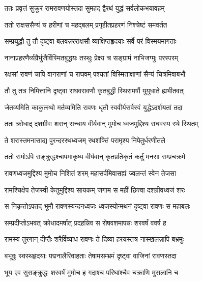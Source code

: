 
\twolineshloka
{ततः प्रवृत्तं सुक्रूरं रामरावणयोस्तदा}
{सुमहद् द्वैरथं युद्धं सर्वलोकभयावहम्} %

\twolineshloka
{ततो राक्षससैन्यं च हरीणां च महद्बलम्}
{प्रगृहीतप्रहरणं निश्चेष्टं समवर्तत} %

\twolineshloka
{सम्प्रयुद्धौ तु तौ दृष्ट्वा बलवन्नरराक्षसौ}
{व्याक्षिप्तहृदयाः सर्वे परं विस्मयमागताः} %

\twolineshloka
{नानाप्रहरणैर्व्यग्रैर्भुजैर्विस्मितबुद्धयः}
{तस्थुः प्रेक्ष्य च सङ्ग्रामं नाभिजग्मुः परस्परम्} %

\twolineshloka
{रक्षसां रावणं चापि वानराणां च राघवम्}
{पश्यतां विस्मिताक्षाणां सैन्यं चित्रमिवाबभौ} %

\twolineshloka
{तौ तु तत्र निमित्तानि दृष्ट्वा राघवरावणौ}
{कृतबुद्धी स्थिरामर्षौ युयुधाते ह्यभीतवत्} %

\twolineshloka
{जेतव्यमिति काकुत्स्थो मर्तव्यमिति रावणः}
{धृतौ स्ववीर्यसर्वस्वं युद्धेऽदर्शयतां तदा} %

\twolineshloka
{ततः क्रोधाद् दशग्रीवः शरान् सन्धाय वीर्यवान्}
{मुमोच ध्वजमुद्दिश्य राघवस्य रथे स्थितम्} %

\twolineshloka
{ते शरास्तमनासाद्य पुरन्दररथध्वजम्}
{रथशक्तिं परामृश्य निपेतुर्धरणीतले} %

\twolineshloka
{ततो रामोऽपि सङ्क्रुद्धश्चापमाकृष्य वीर्यवान्}
{कृतप्रतिकृतं कर्तुं मनसा सम्प्रचक्रमे} %

\twolineshloka
{रावणध्वजमुद्दिश्य मुमोच निशितं शरम्}
{महासर्पमिवासह्यं ज्वलन्तं स्वेन तेजसा} %

\twolineshloka
{रामश्चिक्षेप तेजस्वी केतुमुद्दिश्य सायकम्}
{जगाम स महीं छित्त्वा दशग्रीवध्वजं शरः} %

\twolineshloka
{स निकृत्तोऽपतद् भूमौ रावणस्यन्दनध्वजः}
{ध्वजस्योन्मथनं दृष्ट्वा रावणः स महाबलः} %

\twolineshloka
{सम्प्रदीप्तोऽभवत् क्रोधादमर्षात् प्रदहन्निव}
{स रोषवशमापन्नः शरवर्षं ववर्ष ह} %

\twolineshloka
{रामस्य तुरगान् दीप्तैः शरैर्विव्याध रावणः}
{ते दिव्या हरयस्तत्र नास्खलन्नापि बभ्रमुः} %

\twolineshloka
{बभूवुः स्वस्थहृदयाः पद्मनालैरिवाहताः}
{तेषामसम्भ्रमं दृष्ट्वा वाजिनां रावणस्तदा} %

\twolineshloka
{भूय एव सुसङ्क्रुद्धः शरवर्षं मुमोच ह}
{गदाश्च परिघांश्चैव चक्राणि मुसलानि च} %

